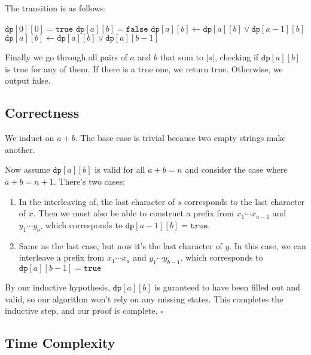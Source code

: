 \documentclass[12pt]{article}
\begin{document}
The transition is as follows:
\begin{algorithmic}
    \State $\texttt{dp}[0][0]=\texttt{true}$
            \State $\texttt{dp}[a][b]=\texttt{false}$
                \State $\texttt{dp}[a][b] \gets \texttt{dp}[a][b] \lor \texttt{dp}[a-1][b]$
            \EndIf
                \State $\texttt{dp}[a][b] \gets \texttt{dp}[a][b] \lor \texttt{dp}[a][b-1]$
            \EndIf
        \EndFor
    \EndFor
\end{algorithmic}

Finally we go through all pairs of $a$ and $b$ that sum to $|s|$,
checking if $\texttt{dp}[a][b]$ is true for any of them.
If there is a true one, we return true.
Otherwise, we output false.

\subsection{Correctness}

We induct on $a+b$. The base case is trivial because two empty strings make another.

Now assume $\texttt{dp}[a][b]$ is valid for all $a+b=n$
and consider the case where $a+b=n+1$.
There's two cases:
\begin{enumerate}[nosep]
    \item In the interleaving of, the last character of $s$ corresponds to the last character of $x$.
          Then we must also be able to construct a prefix from $x_1 \cdots x_{a-1}$ and $y_1 \cdots y_b$,
          which corresponds to $\texttt{dp}[a-1][b]=\texttt{true}$.

    \item Same as the last case, but now it's the last character of $y$.
          In this case, we can interleave a prefix from $x_1 \cdots x_a$ and $y_1 \cdots y_{b-1}$,
          which corresponds to $\texttt{dp}[a][b-1]=\texttt{true}$
\end{enumerate}

By our inductive hypothesis, $\texttt{dp}[a][b]$ is guranteed to have been filled out and valid,
so our algorithm won't rely on any missing states.
This completes the inductive step, and our proof is complete. $\square$

\subsection{Time Complexity}
\end{document}
